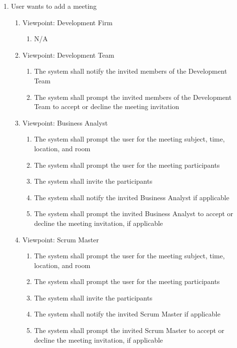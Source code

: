 \documentclass[12pt, titlepage]{article}
\begin{document}
\begin{enumerate}[{BE}1.]
    \item User wants to add a meeting %
    \begin{enumerate}[{VP}1.] 
        \item Viewpoint: Development Firm
            \begin{enumerate}
                \item[] N/A
            \end{enumerate}
        \item Viewpoint: Development Team
            \begin{enumerate}
                \item The system shall notify the invited members of the Development Team
                \item The system shall prompt the invited members of the Development Team to accept or decline the meeting invitation
            \end{enumerate}
        \item Viewpoint: Business Analyst
            \begin{enumerate}
                \item The system shall prompt the user for the meeting subject, time, location, and room
                \item The system shall prompt the user for the meeting participants
                \item The system shall invite the participants
                \item The system shall notify the invited Business Analyst if applicable
                \item The system shall prompt the invited Business Analyst to accept or decline the meeting invitation, if applicable
            \end{enumerate}
        \item Viewpoint: Scrum Master
            \begin{enumerate}
                \item The system shall prompt the user for the meeting subject, time, location, and room
                \item The system shall prompt the user for the meeting participants
                \item The system shall invite the participants
                \item The system shall notify the invited Scrum Master if applicable
                \item The system shall prompt the invited Scrum Master to accept or decline the meeting invitation, if applicable
            \end{enumerate}
    \end{enumerate}
    

\end{enumerate}
\end{document}
